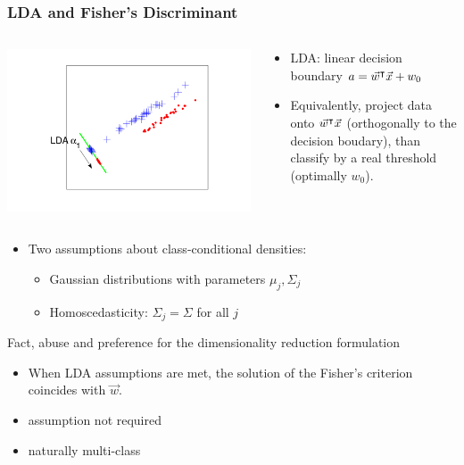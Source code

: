 \begin{frame}
\frametitle{LDA and Fisher's Discriminant}
\begin{columns}
\begin{column}{.5\linewidth}
\includegraphics[width=\textwidth]{figures/LDAprojection.pdf} 
\end{column}
\begin{column}{.6\linewidth}
\begin{itemize}
\item LDA: linear decision boundary $a = \vec{w}^\intercal \vec{x} + w_0$
\item Equivalently, project data onto $\vec{w}^\intercal \vec{x}$ (orthogonally to the decision boudary), than classify by a real threshold (optimally $w_0$). \\
\end{itemize}
\end{column}
\end{columns}

\begin{itemize}
\item Two assumptions about class-conditional densities: 
\begin{itemize}
\item Gaussian distributions with parameters $\mu_j, \Sigma_j$
\item Homoscedasticity: $\Sigma_j=\Sigma$ for all $j$
\end{itemize}
\end{itemize}

\begin{block}{Fact, abuse and preference for the dimensionality reduction formulation}
\begin{itemize}
\item When LDA assumptions are met, the solution of the Fisher's criterion coincides with $\vec{w}$. 
\item assumption not required
\item naturally multi-class
\end{itemize}
\end{block}

\end{frame}

